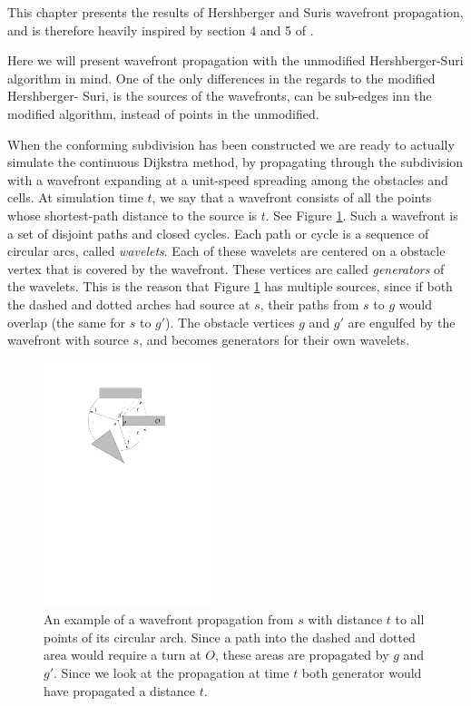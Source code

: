 \label{chapter:wavefrontpropagation}

This chapter presents the results of Hershberger and Suris wavefront propagation, 
and is therefore heavily inspired by section 4 and 5 of \cite{HershbergerS99}.

Here we will present wavefront propagation with the unmodified Hershberger-Suri 
algorithm in mind. One of the only differences in the regards to the modified Hershberger-
Suri, is the sources of the wavefronts, can be sub-edges inn the modified algorithm, 
instead of points in the unmodified.

When the conforming subdivision has been constructed we are ready to actually 
simulate the continuous Dijkstra method, by propagating through the subdivision with 
a wavefront expanding at a unit-speed spreading among the obstacles and cells. At simulation 
time $t$, we say that a wavefront consists of all the points whose shortest-path
distance to the source is $t$. See Figure \ref{fig:wavefrontpropagation}. Such a 
wavefront is a set of disjoint paths and closed cycles. Each path or cycle is a 
sequence of circular arcs, called \textit{wavelets}. Each of these wavelets are 
centered on a obstacle vertex that is covered by the wavefront. These vertices 
are called \textit{generators} of the wavelets. This is the reason that Figure 
\ref{fig:wavefrontpropagation} has multiple sources, since if both the dashed 
and dotted arches had source at $s$, their paths from $s$ to $g$ would overlap 
(the same for $s$ to $g'$). The obstacle vertices $g$ and $g'$ are engulfed by 
the wavefront with source $s$, and becomes generators for their own wavelets.

\begin{figure}
	\centering
	\includegraphics[width=0.45\textwidth]{figures/wavefrontpropagation.pdf}
	\caption{An example of a wavefront propagation from $s$ with distance $t$ to all
    		 points of its circular arch. Since a path into the dashed and dotted 
             area would require a turn at $O$, these areas are propagated 
             by $g$ and $g'$. Since we look at the propagation at time $t$ both 
             generator would have propagated a distance $t$.}
	\label{fig:wavefrontpropagation}
\end{figure}

